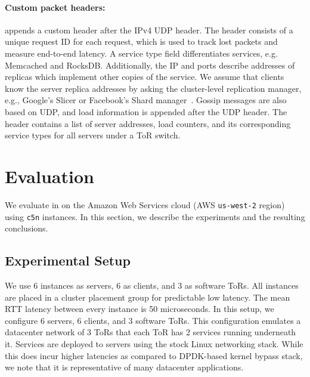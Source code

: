 \paragraph{Custom packet headers:} \daronpon appends a custom header after
the IPv4 UDP header. The header consists of a unique request ID for each
request, which is used to track lost packets and measure end-to-end
latency. A service type field differentiates services, e.g. Memcached
and RocksDB.  Additionally, the IP and ports describe addresses of
replicas which implement other copies of the service.  We assume that
clients know the server replica addresses by asking the cluster-level
replication manager, e.g., Google's Slicer or Facebook's Shard
manager~\cite{facebook_shard,google_slicer,microsoft_service_fabric}.
Gossip messages are also based on UDP, and load information is
appended after the UDP header.  The header contains a list of server
addresses, load counters, and its corresponding service types for all
servers under a ToR switch. 

\section{Evaluation}
\label{daronpon:sec:eval}

\newcommand{\racks}[0]{3\xspace}
\newcommand{\services}[0]{2\xspace}
\newcommand{\servers}[0]{6\xspace}
\newcommand{\servercores}{1\xspace}
\newcommand{\tors}{3\xspace}
\newcommand{\torscores}{16 \xspace}
\newcommand{\clients}{6 \xspace}
\newcommand{\clientcores}{1 \xspace}

We evaluate \daronpon in on the Amazon Web Services cloud (AWS
\texttt{us-west-2} region) using \texttt{c5n} instances. 
%
In this section, we describe the experiments and the resulting conclusions.

\subsection{Experimental Setup}
We use \servers instances as servers, \clients as clients, and
\tors as software ToRs. 
%
All instances are placed in a cluster placement group for predictable low latency. 
%
The mean RTT latency between every instance is 50 microseconds. 
%
In this setup, we configure \servers servers, \clients clients, and \tors software ToRs. 
%
This configuration emulates a datacenter network of \tors ToRs that each ToR has \services services running underneath it.  
%
Services are deployed to servers using the stock Linux networking stack.  
%
While this does incur higher latencies as compared to DPDK-based kernel bypass stack, we note that it is representative of many datacenter applications.

